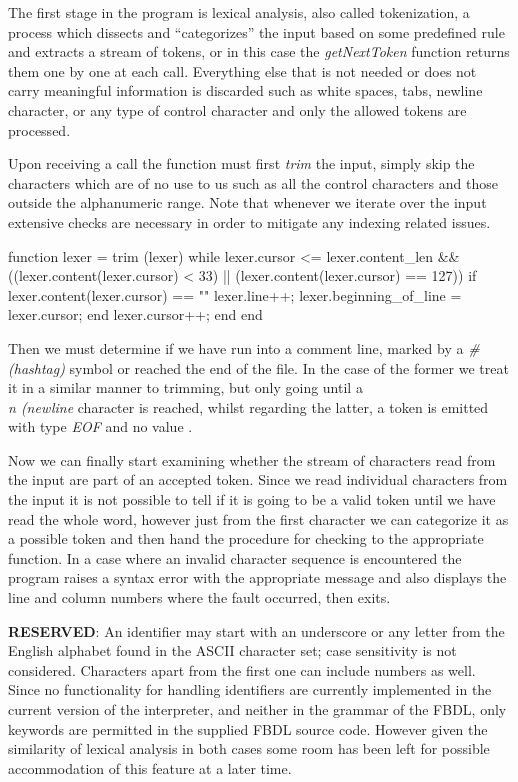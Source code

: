 
The first stage in the program is lexical analysis, also called tokenization, a process which dissects and ``categorizes'' the input based on some predefined rule and extracts a stream of tokens, or in this case the \textit{getNextToken} function returns them one by one at each call. Everything else that is not needed or does not carry meaningful information is discarded such as white spaces, tabs, newline character, or any type of control character and only the allowed tokens are processed.

Upon receiving a call the function must first \textit{trim} the input, simply skip the characters which are of no use to us such as all the control characters and those outside the alphanumeric range. Note that whenever we iterate over the input extensive checks are necessary in order to mitigate any indexing related issues.

\begin{octave}
function lexer = trim (lexer)
  while lexer.cursor <= lexer.content_len &&
  		((lexer.content(lexer.cursor) < 33) ||
  		(lexer.content(lexer.cursor) == 127))
        if lexer.content(lexer.cursor) == "\n"
        lexer.line++;
        lexer.beginning_of_line = lexer.cursor;
      end
      lexer.cursor++;
   end
end
\end{octave}

Then we must determine if we have run into a comment line, marked by a \textit{\# (hashtag)} symbol or reached the end of the file. In the case of the former we treat it in a similar manner to trimming, but only going until a \textit{\\n (newline} character is reached, whilst regarding the latter, a token is emitted with type \textit{EOF} and no value .

Now we can finally start examining whether the stream of characters read from the input are part of an accepted token. Since we read individual characters from the input it is not possible to tell if it is going to be a valid token until we have read the whole word, however just from the first character we can categorize it as a possible token and then hand the procedure for checking to the appropriate function. In a case where an invalid character sequence is encountered the program raises a syntax error with the appropriate message and also displays the line and column numbers where the fault occurred, then exits.

\textbf{RESERVED}: An identifier may start with an underscore or any letter from the English alphabet found in the ASCII character set; case sensitivity is not considered. Characters apart from the first one can include numbers as well. Since no functionality for handling identifiers are currently implemented in the current version of the interpreter, and neither in the grammar of the FBDL, only keywords are permitted in the supplied FBDL source code. However given the similarity of lexical analysis in both cases some room has been left for possible accommodation of this feature at a later time.

